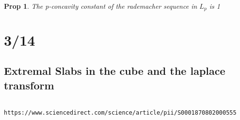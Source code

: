 \documentclass[11pt]{article}
\newtheorem{prop}{Prop}
\theoremstyle{remark}
\begin{document}
\begin{prop}
	The p-concavity constant of the rademacher sequence in $L_p$ is 1
\end{prop}

\section{3/14}

\subsection{Extremal Slabs in the cube and the laplace transform}

\begin{verbatim}
	https://www.sciencedirect.com/science/article/pii/S0001870802000555
\end{verbatim}
\end{document}
